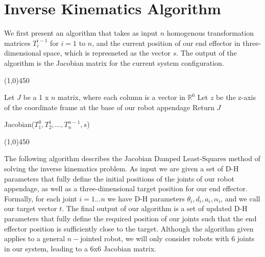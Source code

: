 \section{Inverse Kinematics Algorithm}
We first present an algorithm that takes as input $n$ homogenous transformation matrices $T^{i-1}_i$ for $i=1$ to $n$, and
the current position of our end effector in three-dimensional space, which is represneted as the vector $s$. 
The output of the algorithm is the Jacobian matrix for the current system configuration.\\

\begin{center}
\line(1,0){450}
\end{center}
\begin{algorithm}[H]
\DontPrintSemicolon
Let $J$ be a 1 x $n$ matrix, where each column is a vector in $\mathbb{R}^6$\;
Let $z$ be the z-axis of the coordinate frame at the base of our robot appendage\;
Return $J$
\caption{Jacobian($T^0_1, T^1_2, \ldots, T^{n-1}_n, s$)\label{IR}}
\begin{center}
\noindent\line(1,0){450}
\end{center}
\end{algorithm}
\vspace{2mm}

The following algorithm describes the Jacobian Damped Least-Squares method of solving the inverse kinematics problem. 
As input we are given a set of D-H parameters that fully define
the initial positions of the joints of our robot appendage, as well as a three-dimensional target position for our end effector. 
Formally, for each joint $i = 1 \ldots n$ we have D-H parameters $\theta_i, d_i, a_i, \alpha_i$, and
we call our target vector $t$. The final output of our algorithm is a set of updated D-H parameters that fully define
the required position of our joints such that the end effector position is sufficiently close to the target.
Although the algorithm given applies to a general $n-$jointed robot, we will only consider robots with 6 joints in our system, leading
to a 6x6 Jacobian matrix.


